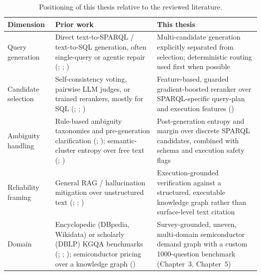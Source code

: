 \documentclass[
  12pt,
  english,
  oneside]{report}
\begin{document}
\begin{table}[htbp]
\centering
\caption{Positioning of this thesis relative to the reviewed literature.}
\label{tab:related-work-summary}
\begin{tabular}{p{3.3cm}p{5.3cm}p{5.3cm}}
\hline
\textbf{Dimension} & \textbf{Prior work} & \textbf{This thesis} \\
\hline
Query generation &
Direct text-to-SPARQL / text-to-SQL generation, often single-query or
agentic repair
(\citealt{meyer2024assessing}; \citealt{avila2024experiments};
\citealt{liu2024spinach}) &
Multi-candidate generation explicitly separated from selection;
deterministic routing used first when possible \\
Candidate selection &
Self-consistency voting, pairwise LLM judges, or trained rerankers, mostly
for SQL
(\citealt{wang2023selfconsistency}; \citealt{pourreza2024chasesql};
\citealt{li2025xiyansql}) &
Feature-based, guarded gradient-boosted reranker over SPARQL-specific
query-plan and execution features (\citealt{chen2016xgboost}) \\
Ambiguity handling &
Rule-based ambiguity taxonomies and pre-generation clarification
(\citealt{wang2023knowwhat}; \citealt{ding2025ambisql}); semantic-cluster
entropy over free text (\citealt{kuhn2023semantic};
\citealt{farquhar2024detecting}) &
Post-generation entropy and margin over discrete SPARQL candidates,
combined with schema and execution safety flags \\
Reliability framing &
General RAG / hallucination mitigation over unstructured text
(\citealt{lewis2020retrieval}; \citealt{ji2023survey};
\citealt{gao2023retrieval}) &
Execution-grounded verification against a structured, executable
knowledge graph rather than surface-level text citation \\
Domain &
Encyclopedic (DBpedia, Wikidata) or scholarly (DBLP) KGQA benchmarks
(\citealt{trivedi2017lcquad}; \citealt{dubey2019lcquad2};
\citealt{banerjee2023dblpquad}); semiconductor pricing over a knowledge
graph (\citealt{ramzy2021knowgraphpm}) &
Survey-grounded, uneven, multi-domain semiconductor demand graph with a
custom 1000-question benchmark (Chapter~3, Chapter~5) \\
\hline
\end{tabular}
\end{table}
\end{document}
